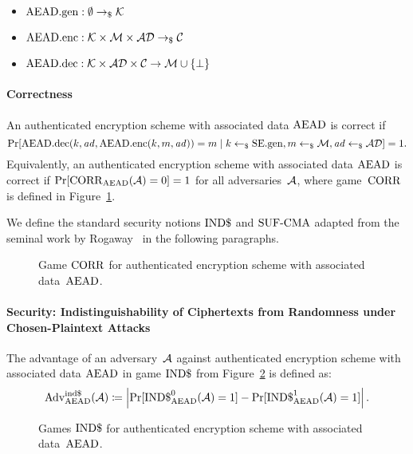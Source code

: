 \documentclass[a4paper,orivec]{llncs}
\begin{document}
\begin{itemize}
    \item $\mathrm{AEAD}.\mathrm{gen}: \emptyset \to_\$ \mathcal{K}$
    \item $\mathrm{AEAD}.\mathrm{enc}: \mathcal{K}\times\mathcal{M}\times\mathcal{AD} \to_\$ \mathcal{C}$
    \item $\mathrm{AEAD}.\mathrm{dec}: \mathcal{K}\times\mathcal{AD}\times\mathcal{C} \to \mathcal{M}\cup\{\bot\}$
\end{itemize}

\paragraph{Correctness}
An authenticated encryption scheme with associated data $\mathrm{AEAD}$ is correct if 
\[
\Pr[\mathrm{AEAD}.\mathrm{dec}(k,\mathit{ad},\mathrm{AEAD}.\mathrm{enc}(k,m,\mathit{ad}))=m\mid k\gets_\$\mathrm{SE}.\mathrm{gen},m\gets_\$\mathcal{M},\mathit{ad}\gets_\$\mathcal{AD}]=1\text{.}
\]
Equivalently, an authenticated encryption scheme with associated data $\mathrm{AEAD}$ is correct if $\Pr[\mathrm{CORR}_{\mathrm{AEAD}}(\mathcal{A})=0]=1$ for all adversaries~$\mathcal{A}$, where game~$\mathrm{CORR}$ is defined in Figure~\ref{fig:sym:aenc:corr}.

We define the standard security notions ${\mathrm{IND}\$}$ and ${\mathrm{SUF}\text{-}\mathrm{CMA}}$ adapted from the seminal work by Rogaway~\cite{CCS:Rogaway02} in the following paragraphs.

\begin{figure}[!ht]
    \centering
    \nicoresetlinenr%
    \fbox{%
        \scalebox{\codescalefactor}{%
        }%
    }
    \caption{%
        Game $\mathrm{CORR}$ for authenticated encryption scheme with associated data~$\mathrm{AEAD}$.
    }
    \label{fig:sym:aenc:corr}
\end{figure}

\paragraph{Security: Indistinguishability of Ciphertexts from Randomness under Chosen-Plaintext Attacks}
The advantage of an adversary~$\mathcal{A}$ against authenticated encryption scheme with associated data $\mathrm{AEAD}$ in game ${\mathrm{IND}\$}$ from Figure~\ref{fig:sym:aenc:indd} is defined as:
\[
\mathrm{Adv}_{\mathrm{AEAD}}^{\mathrm{ind}\$}(\mathcal{A})\coloneqq\left|\Pr[{\mathrm{IND}\$}_{\mathrm{AEAD}}^0(\mathcal{A})=1]-\Pr[{\mathrm{IND}\$}_{\mathrm{AEAD}}^1(\mathcal{A})=1]\right|\text{.}
\]

\begin{figure}[!ht]
    \centering
    \nicoresetlinenr%
    \fbox{%
        \scalebox{\codescalefactor}{%
        }%
    }
    \caption{%
        Games ${\mathrm{IND}\$}$ for authenticated encryption scheme with associated data~$\mathrm{AEAD}$.
    }
    \label{fig:sym:aenc:indd}
\end{figure}
\end{document}
